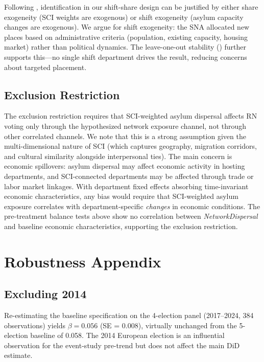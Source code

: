 \documentclass[12pt]{article}
\begin{document}
Following \citet{borusyak2022quasi}, identification in our shift-share design can be justified by either share exogeneity (SCI weights are exogenous) or shift exogeneity (asylum capacity changes are exogenous). We argue for shift exogeneity: the SNA allocated new places based on administrative criteria (population, existing capacity, housing market) rather than political dynamics. The leave-one-out stability () further supports this---no single shift department drives the result, reducing concerns about targeted placement.

\subsection{Exclusion Restriction}

The exclusion restriction requires that SCI-weighted asylum dispersal affects RN voting only through the hypothesized network exposure channel, not through other correlated channels. We note that this is a strong assumption given the multi-dimensional nature of SCI (which captures geography, migration corridors, and cultural similarity alongside interpersonal ties). The main concern is economic spillovers: asylum dispersal may affect economic activity in hosting departments, and SCI-connected departments may be affected through trade or labor market linkages. With department fixed effects absorbing time-invariant economic characteristics, any bias would require that SCI-weighted asylum exposure correlates with department-specific \textit{changes} in economic conditions. The pre-treatment balance tests above show no correlation between \textit{NetworkDispersal} and baseline economic characteristics, supporting the exclusion restriction.

\section{Robustness Appendix}
\label{app:robustness}

\subsection{Excluding 2014}

Re-estimating the baseline specification on the 4-election panel (2017--2024, 384 observations) yields $\beta = 0.056$ (SE = 0.008), virtually unchanged from the 5-election baseline of 0.058. The 2014 European election is an influential observation for the event-study pre-trend but does not affect the main DiD estimate.
\end{document}
